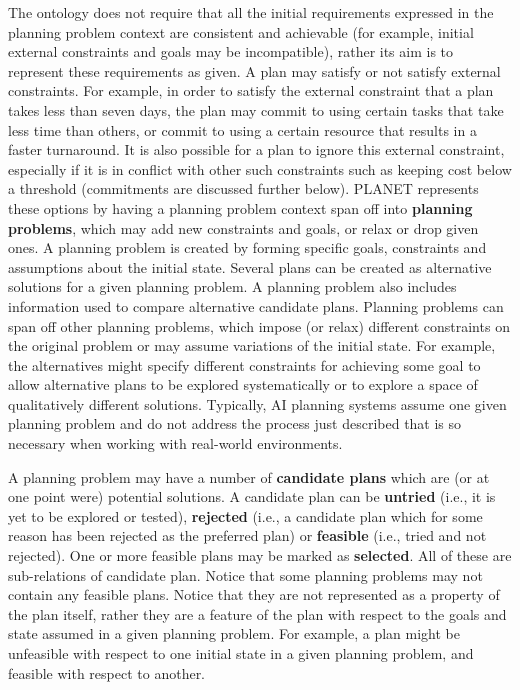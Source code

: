 The ontology does not require that all the initial 
requirements expressed in the planning problem context are 
consistent and achievable  
(for example, initial external constraints and goals may be incompatible),
rather its aim is to represent these requirements as given.
A plan may satisfy or not satisfy external constraints.
For example, in order to satisfy the external constraint that 
a plan takes less than seven days, the plan 
may commit to using certain tasks that take less time
than others,
or commit to using a certain resource 
that results in a faster turnaround.  
It is also possible for a plan to ignore this 
external constraint, especially if it is in conflict with 
other such constraints such as keeping cost below a threshold
(commitments are discussed further below).
PLANET represents these options by having 
a planning problem context span off 
into {\bf planning problems}, which may
add new constraints and goals,
or relax or drop given ones.  
A planning problem is created by forming
specific goals, constraints and assumptions about the initial state.
Several plans can be created 
as alternative solutions for a given planning problem.
A planning problem also includes information used to
compare alternative candidate plans.
Planning problems can span off other planning problems, 
which impose (or relax) different constraints on
the original problem or may assume variations of the initial state. For
example, the alternatives might specify different constraints 
for achieving some
goal to allow alternative plans to be explored systematically
or to explore a space of qualitatively different solutions. 
Typically, AI planning systems assume one given planning problem 
and do not address the process just described that is so 
necessary when working with real-world environments.

A planning problem may have a number of
{\bf candidate plans} which are (or at one point were) potential
solutions. 
A candidate plan can be {\bf untried} (i.e., it is yet to be explored or
tested), {\bf rejected} (i.e., a candidate plan which for some reason
has been rejected as the preferred plan)
or {\bf feasible} (i.e., tried and not rejected).
One or more feasible plans may be marked as {\bf selected}.
All of these are sub-relations of candidate plan. 
Notice that some planning problems may not contain
any feasible plans.  
Notice that they are not represented as a property of the plan itself,
rather they are a feature of the plan with respect to the goals and state
assumed in a given planning problem. 
For example, a plan might be unfeasible with respect to one
initial state in a given planning problem, and feasible
with respect to another.



